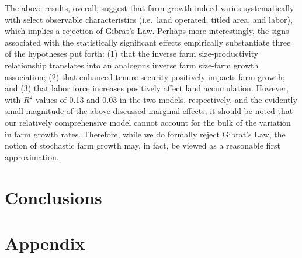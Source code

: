 \documentclass[english]{article}
\begin{document}
The above results, overall, suggest that farm growth indeed varies systematically with select observable characteristics (i.e.\ land operated, titled area, and labor), which implies a rejection of Gibrat's Law. Perhaps more interestingly, the signs associated with the statistically significant effects empirically substantiate three of the hypotheses put forth: (1) that the inverse farm size-productivity relationship translates into an analogous inverse farm size-farm growth association; (2) that enhanced tenure security positively impacts farm growth; and (3) that labor force increases positively affect land accumulation. However, with $R^2$ values of 0.13 and 0.03 in the two models, respectively, and the evidently small magnitude of the above-discussed marginal effects, it should be noted that our relatively comprehensive model cannot account for the bulk of the variation in farm growth rates. Therefore, while we do formally reject Gibrat's Law, the notion of stochastic farm growth may, in fact, be viewed as a reasonable first approximation.


\section{Conclusions}
\label{sec: conclusions}


\newpage
\cleardoublepage
\singlespacing




\newpage


\newpage
\doublespacing
\section*{Appendix}
\end{document}
